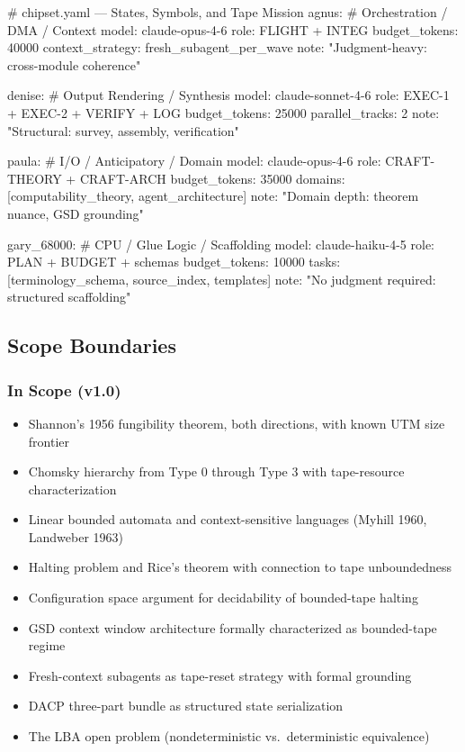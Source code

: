 \documentclass[11pt,letterpaper]{article}
\begin{document}
\begin{asciibox}
# chipset.yaml --- States, Symbols, and Tape Mission
agnus:                    # Orchestration / DMA / Context
  model: claude-opus-4-6
  role: FLIGHT + INTEG
  budget_tokens: 40000
  context_strategy: fresh_subagent_per_wave
  note: "Judgment-heavy: cross-module coherence"

denise:                   # Output Rendering / Synthesis
  model: claude-sonnet-4-6
  role: EXEC-1 + EXEC-2 + VERIFY + LOG
  budget_tokens: 25000
  parallel_tracks: 2
  note: "Structural: survey, assembly, verification"

paula:                    # I/O / Anticipatory / Domain
  model: claude-opus-4-6
  role: CRAFT-THEORY + CRAFT-ARCH
  budget_tokens: 35000
  domains: [computability_theory, agent_architecture]
  note: "Domain depth: theorem nuance, GSD grounding"

gary_68000:               # CPU / Glue Logic / Scaffolding
  model: claude-haiku-4-5
  role: PLAN + BUDGET + schemas
  budget_tokens: 10000
  tasks: [terminology_schema, source_index, templates]
  note: "No judgment required: structured scaffolding"
\end{asciibox}

\subsection{Scope Boundaries}

\subsubsection{In Scope (v1.0)}
\begin{itemize}
  \item Shannon's 1956 fungibility theorem, both directions, with known UTM size frontier
  \item Chomsky hierarchy from Type 0 through Type 3 with tape-resource characterization
  \item Linear bounded automata and context-sensitive languages (Myhill 1960, Landweber 1963)
  \item Halting problem and Rice's theorem with connection to tape unboundedness
  \item Configuration space argument for decidability of bounded-tape halting
  \item GSD context window architecture formally characterized as bounded-tape regime
  \item Fresh-context subagents as tape-reset strategy with formal grounding
  \item DACP three-part bundle as structured state serialization
  \item The LBA open problem (nondeterministic vs.\ deterministic equivalence)
\end{itemize}
\end{document}
